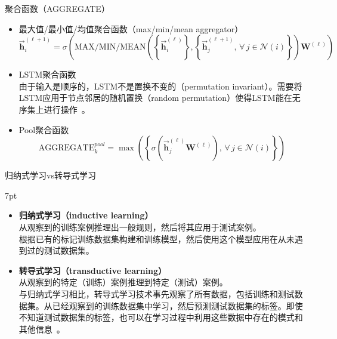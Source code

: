 \documentclass{beamer}
\newenvironment{formal}{%
	\def\FrameCommand{%
		\hspace{1pt}%
		{\color{deepgreen}\vrule width 2pt}%
		{\color{greenshade}\vrule width 4pt}%
		\colorbox{greenshade}%
	}%
	\MakeFramed{\advance\hsize-\width\FrameRestore}%
	\noindent\hspace{-4.55pt}%
	\begin{adjustwidth}{}{7pt}%
		\vspace{2pt}\vspace{2pt}%
	}
	{%
		\vspace{2pt}
	\end{adjustwidth}\endMakeFramed%
}
\begin{document}
\begin{frame}{聚合函数（AGGREGATE）}
	\begin{itemize}
		\item {\color{red}最大值/最小值/均值聚合函数（max/min/mean aggregator）}
		\begin{equation}
			\vec{\textbf{h}}^{\left(\ell+1\right)}_i=\sigma\left(\text{MAX/MIN/MEAN}\left(\left\{\vec{\textbf{h}}^{\left(\ell\right)}_i\right\},\left\{\vec{\textbf{h}}^{\left(\ell+1\right)}_j,\,\forall\, j\in\mathcal{N}\left(i\right)\right\}\right)\textbf{W}^{\left(\ell\right)}\right)
		\end{equation}
		\item {\color{red}LSTM聚合函数}\\
		由于输入是顺序的，LSTM不是置换不变的（permutation invariant）。需要将LSTM应用于节点邻居的随机置换（random permutation）使得LSTM能在无序集上进行操作~\cite{hamilton2017graphsage}。
		\item {\color{red}Pool聚合函数}\\
		\begin{equation}
			\text{AGGREGATE}_k^{pool}=\max\left(\left\{\sigma\left(\vec{\textbf{h}}^{\left(\ell\right)}_j\textbf{W}^{\left(\ell\right)}\right),\,\forall\, j\in\mathcal{N}\left(i\right)\right\}\right)
		\end{equation}
	\end{itemize}
\end{frame}

\begin{frame}{归纳式学习vs转导式学习}
	\begin{formal}
		\begin{itemize}
			\item {\color{red}\textbf{归纳式学习（inductive learning）}} \\
			从观察到的训练案例推理出一般规则，然后将其应用于测试案例。\\
			根据已有的标记训练数据集构建和训练模型，然后使用这个模型应用在从未遇到过的测试数据集。
			\item {\color{red}\textbf{转导式学习（transductive learning）}} \\
			从观察到的特定（训练）案例推理到特定（测试）案例。\\
			与归纳式学习相比，转导式学习技术事先观察了所有数据，包括训练和测试数据集。从已经观察到的训练数据集中学习，然后预测测试数据集的标签。即使不知道测试数据集的标签，也可以在学习过程中利用这些数据中存在的模式和其他信息~\cite{vm2020intr}。
		\end{itemize}
	\end{formal}
\end{frame}
\end{document}
